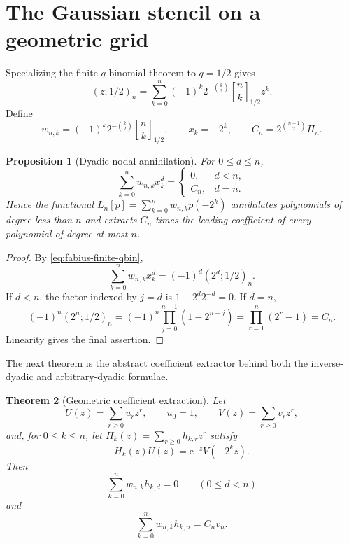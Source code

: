 \documentclass[11pt,oneside,openany]{book}
\newtheorem{theorem}{Theorem}[chapter]
\newtheorem{proposition}[theorem]{Proposition}
\theoremstyle{definition}
\theoremstyle{remark}
\newcommand{\Qbinom}[3]{\genfrac{[}{]}{0pt}{}{#1}{#2}_{#3}}
\newcommand{\e}{\mathrm e}
\begin{document}
\section{The Gaussian stencil on a geometric grid}

Specializing the finite $q$-binomial theorem to $q=1/2$ gives
\begin{equation}\label{eq:fabius-finite-qbin}
 (z;1/2)_n
 =\sum_{k=0}^n(-1)^k2^{-\binom k2}
   \Qbinom nk{1/2}z^k.
\end{equation}
Define
\begin{equation}\label{eq:fabius-weights}
 w_{n,k}=(-1)^k2^{-\binom k2}\Qbinom nk{1/2},
 \qquad x_k=-2^k,
 \qquad C_n=2^{\binom{n+1}{2}}\Pi_n.
\end{equation}

\begin{proposition}[Dyadic nodal annihilation]\label{prop:fabius-nodal-annihilation}
For $0\le d\le n$,
\begin{equation}\label{eq:fabius-nodal-moments}
 \sum_{k=0}^nw_{n,k}x_k^d
 =\begin{cases}
 0,&d<n,\\
 C_n,&d=n.
 \end{cases}
\end{equation}
Hence the functional
$L_n[p]=\sum_{k=0}^nw_{n,k}p(-2^k)$ annihilates polynomials of degree
less than $n$ and extracts $C_n$ times the leading coefficient of every
polynomial of degree at most $n$.
\end{proposition}

\begin{proof}
By \eqref{eq:fabius-finite-qbin},
\[
 \sum_{k=0}^nw_{n,k}x_k^d
 =(-1)^d(2^d;1/2)_n.
\]
If $d<n$, the factor indexed by $j=d$ is $1-2^d2^{-d}=0$.  If $d=n$,
\[
 (-1)^n(2^n;1/2)_n
 =(-1)^n\prod_{j=0}^{n-1}(1-2^{n-j})
 =\prod_{r=1}^n(2^r-1)=C_n.
\]
Linearity gives the final assertion.
\end{proof}

The next theorem is the abstract coefficient extractor behind both the
inverse-dyadic and arbitrary-dyadic formulae.

\begin{theorem}[Geometric coefficient extraction]\label{thm:fabius-coefficient-extraction}
Let
\[
 U(z)=\sum_{r\ge0}u_rz^r,\qquad u_0=1,
 \qquad
 V(z)=\sum_{r\ge0}v_rz^r,
\]
and, for $0\le k\le n$, let
$H_k(z)=\sum_{r\ge0}h_{k,r}z^r$ satisfy
\begin{equation}\label{eq:fabius-abstract-bridge}
 H_k(z)U(z)=\e^{-z}V(-2^kz).
\end{equation}
Then
\begin{equation}\label{eq:fabius-coeff-lower}
 \sum_{k=0}^nw_{n,k}h_{k,d}=0\qquad(0\le d<n)
\end{equation}
and
\begin{equation}\label{eq:fabius-coeff-top}
 \sum_{k=0}^nw_{n,k}h_{k,n}=C_nv_n.
\end{equation}
\end{theorem}
\end{document}
